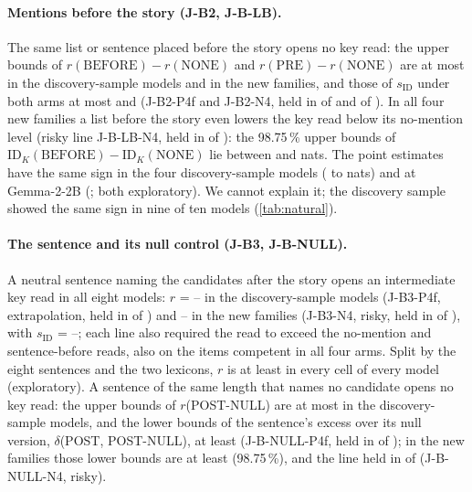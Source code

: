 \paragraph{Mentions before the story (J-B2, J-B-LB).} The same list or sentence placed before the story opens no key read: the upper bounds of $r(\text{BEFORE}) - r(\text{NONE})$ and $r(\text{PRE}) - r(\text{NONE})$ are at most \JbTwoRUbPfourMax{} in the discovery-sample models and \JbTwoRUbNfourMax{} in the new families, and those of $s_{\mathrm{ID}}$ under both arms at most \JbTwoSidUbPfourMax{} and \JbTwoSidUbNfourMax{} (J-B2-P4f and J-B2-N4, held in \JbTwoPfMet{} of \JbTwoPfEval{} and \JbTwoNfMet{} of \JbTwoNfEval{}). In all four new families a list before the story even lowers the key read below its no-mention level (risky line J-B-LB-N4, held in \JbLbNfMet{} of \JbLbNfEval{}): the 98.75\,\% upper bounds of $\mathrm{ID}_K(\text{BEFORE}) - \mathrm{ID}_K(\text{NONE})$ lie between \JbLbUbLlamaEight{} and \JbLbUbGemmaNine{} nats. The point estimates have the same sign in the four discovery-sample models (\JbLbDiffMistralSeven{} to \JbLbDiffQwenFourteen{} nats) and at Gemma-2-2B (\JbLbDiffGemmaTwo{}; both exploratory). We cannot explain it; the discovery sample showed the same sign in nine of ten models (\cref{tab:natural}).

\paragraph{The sentence and its null control (J-B3, J-B-NULL).} A neutral sentence naming the candidates after the story opens an intermediate key read in all eight models: $r$ = \JbRangeRPostPfourMin{}--\JbRangeRPostPfourMax{} in the discovery-sample models (J-B3-P4f, extrapolation, held in \JbThreePfMet{} of \JbThreePfEval{}) and \JbRangeRPostNfourMin{}--\JbRangeRPostNfourMax{} in the new families (J-B3-N4, risky, held in \JbThreeNfMet{} of \JbThreeNfEval{}), with $s_{\mathrm{ID}}$ = \JbRangeSidPostEightMin{}--\JbRangeSidPostEightMax{}; each line also required the read to exceed the no-mention and sentence-before reads, also on the items competent in all four arms. Split by the eight sentences and the two lexicons, $r$ is at least \JbLevelRPostMin{} in every cell of every model (exploratory). A sentence of the same length that names no candidate opens no key read: the upper bounds of $r$(POST-NULL) are at most \JbNullRUbPfourMax{} in the discovery-sample models, and the lower bounds of the sentence's excess over its null version, $\delta$(POST, POST-NULL), at least \JbNullDeltaLbPfourMin{} (J-B-NULL-P4f, held in \JbNullPfMet{} of \JbNullPfEval{}); in the new families those lower bounds are at least \JbNullDeltaLbNfourMin{} (98.75\,\%), and the line held in \JbNullNfMet{} of \JbNullNfEval{} (J-B-NULL-N4, risky).


